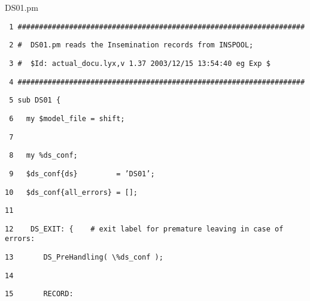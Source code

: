 %
\begin{table}[htbp]

\caption{DS01.pm\label{tab:DS01.pm}}

\texttt{\scriptsize ~1 \#\#\#\#\#\#\#\#\#\#\#\#\#\#\#\#\#\#\#\#\#\#\#\#\#\#\#\#\#\#\#\#\#\#\#\#\#\#\#\#\#\#\#\#\#\#\#\#\#\#\#\#\#\#\#\#\#\#\#\#\#\#\#\#\#\#\#}{\scriptsize \par}

\texttt{\scriptsize ~2 \#~ DS01.pm reads the Insemination records
from INSPOOL;}{\scriptsize \par}

\texttt{\scriptsize ~3 \#~ \$Id: actual\_docu.lyx,v 1.37 2003/12/15
13:54:40 eg Exp \$~ }{\scriptsize \par}

\texttt{\scriptsize ~4 \#\#\#\#\#\#\#\#\#\#\#\#\#\#\#\#\#\#\#\#\#\#\#\#\#\#\#\#\#\#\#\#\#\#\#\#\#\#\#\#\#\#\#\#\#\#\#\#\#\#\#\#\#\#\#\#\#\#\#\#\#\#\#\#\#\#\#}{\scriptsize \par}

\texttt{\scriptsize ~5 sub DS01 \{}{\scriptsize \par}

\texttt{\scriptsize ~6~~ my \$model\_file = shift;}{\scriptsize \par}

\texttt{\scriptsize ~7 }{\scriptsize \par}

\texttt{\scriptsize ~8~~ my \%ds\_conf;}{\scriptsize \par}

\texttt{\scriptsize ~9~~ \$ds\_conf\{ds\}~~~~~~~~ = 'DS01';}{\scriptsize \par}

\texttt{\scriptsize 10~~ \$ds\_conf\{all\_errors\} = {[}{]};}{\scriptsize \par}

\texttt{\scriptsize 11 }{\scriptsize \par}

\texttt{\scriptsize 12~~~ DS\_EXIT: \{~~~ \# exit label for
premature leaving in case of errors:}{\scriptsize \par}

\texttt{\scriptsize 13~~~~~~ DS\_PreHandling( \textbackslash{}\%ds\_conf
);}{\scriptsize \par}

\texttt{\scriptsize 14 }{\scriptsize \par}

\texttt{\scriptsize 15~~~~~~ RECORD:}{\scriptsize \par}


\end{table}
